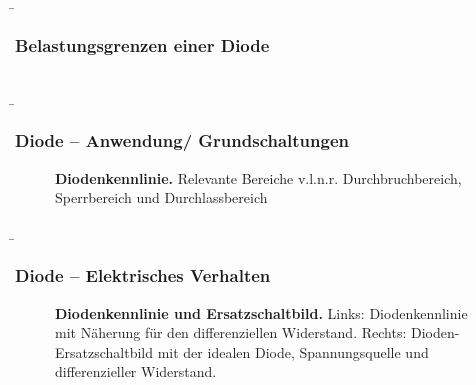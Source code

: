 \begin{frame}
\b{\frametitle{Belastungsgrenzen einer Diode}
    \begin{columns}
            \resizebox{1\totalheight}{!}{}
                  
        
                \begin{itemize}
                \end{itemize}
            \end{columns}}
        \end{frame}

\begin{frame}
    \b{\frametitle{Diode -- Anwendung/ Grundschaltungen}
        \begin{figure}[H]
            \centering
            
            \caption{\textbf{Diodenkennlinie.} Relevante Bereiche v.l.n.r. Durchbruchbereich, Sperrbereich und Durchlassbereich}  
        \end{figure}
    }
\end{frame}

\begin{frame}
    \b{\frametitle{Diode -- Elektrisches Verhalten}
        \begin{figure}[H]
            \caption{\textbf{Diodenkennlinie und Ersatzschaltbild.} Links: Diodenkennlinie mit Näherung für den differenziellen
            Widerstand. Rechts: Dioden-Ersatzschaltbild mit der idealen Diode, Spannungsquelle und differenzieller Widerstand.} 
        \end{figure}

    }
\end{frame}

